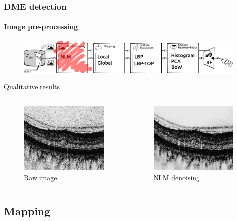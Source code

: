\documentclass{beamer}
\begin{document}
\begin{frame}
  \frametitle{DME detection}
  \framesubtitle{Image pre-processing}
  \begin{figure}
    \centering
    \includegraphics[width=.5\textwidth]{./images/ml-nlm.png}
  \end{figure}
  \begin{block}{Qualitative results}
    \begin{columns}
      \begin{column}{.5\linewidth}
        \begin{figure}
          \centering
          \includegraphics[width=.4\textwidth]{./images/raw_crop_grey.png}
          \caption{Raw image}
        \end{figure}
      \end{column}
      \begin{column}{.5\linewidth}
        \begin{figure}
          \centering
          \includegraphics[width=.4\textwidth]{./images/nlm_crop_grey.png}
          \caption{NLM denoising}
        \end{figure}
      \end{column}
    \end{columns}
  \end{block}
\end{frame}

\subsection{Mapping}
\end{document}
